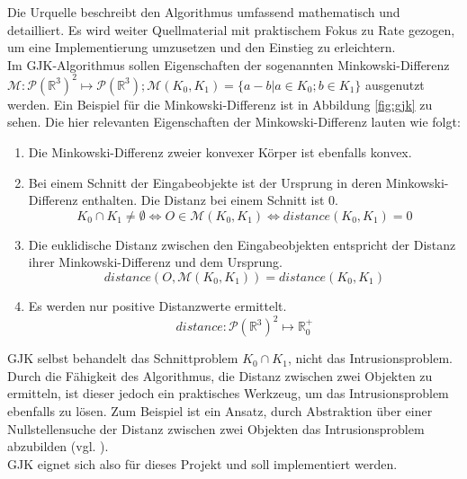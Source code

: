 Die Urquelle \cite{gjk} beschreibt den Algorithmus umfassend mathematisch und detailliert. Es wird weiter Quellmaterial \cite{gjk-casey} mit praktischem Fokus zu Rate gezogen, um eine Implementierung umzusetzen und den Einstieg zu erleichtern.\\
Im GJK-Algorithmus sollen Eigenschaften der sogenannten Minkowski-Differenz $\mathcal{M}:\mathcal{P}(\mathbb{R}^3)^2\mapsto \mathcal{P}(\mathbb{R}^3); \mathcal{M}(K_0, K_1) = \{a - b| a\in K_0 ; b\in K_1\}$ \cite[p.195]{gjk} ausgenutzt werden.
Ein Beispiel für die Minkowski-Differenz ist in Abbildung \ref{fig:gjk} zu sehen. Die hier relevanten Eigenschaften der Minkowski-Differenz lauten wie folgt:\\
	\begin{enumerate}
		\item Die Minkowski-Differenz zweier konvexer Körper ist ebenfalls konvex.
		\item Bei einem Schnitt der Eingabeobjekte ist der Ursprung in deren Minkowski-Differenz enthalten. Die Distanz bei einem Schnitt ist $0$.
		$$ K_0 \cap K_1 \neq \emptyset \Leftrightarrow O \in \mathcal{M}(K_0, K_1)	\Leftrightarrow distance(K_0, K_1) = 0 $$
		\item Die euklidische Distanz zwischen den Eingabeobjekten entspricht der Distanz ihrer Minkowski-Differenz und dem Ursprung. $$distance(O, \mathcal{M}(K_0, K_1)) = distance(K_0, K_1)$$
		\item Es werden nur positive Distanzwerte ermittelt. $$distance: \mathcal{P}(\mathbb{R}^3)^2 \mapsto \mathbb{R}^+_0$$
	\end{enumerate}
GJK selbst behandelt das Schnittproblem $ K_0 \cap K_1$, nicht das Intrusionsproblem.
Durch die Fähigkeit des Algorithmus, die Distanz zwischen zwei Objekten zu ermitteln, ist dieser jedoch ein praktisches Werkzeug, um das Intrusionsproblem ebenfalls zu lösen.
Zum Beispiel ist ein Ansatz, durch Abstraktion über einer Nullstellensuche der Distanz zwischen zwei Objekten das Intrusionsproblem abzubilden (vgl. \cite{gdc-physics}).\\
GJK eignet sich also für dieses Projekt und soll implementiert werden.\\

